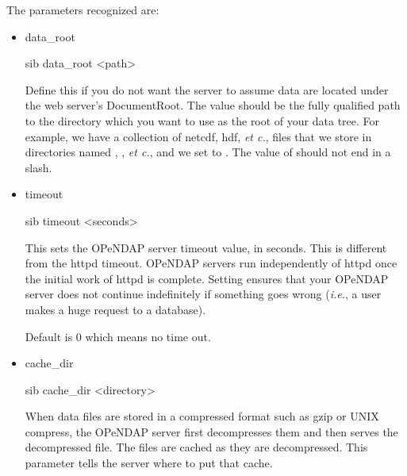 \documentclass{dods-book}
\begin{document}
  The parameters recognized are:

\begin{itemize}

\item data\_root

\begin{vcode}{sib}
  data_root <path>
\end{vcode}

Define this if you do not want the server to assume data are located
under the web server's DocumentRoot. The value  should be the
fully qualified path to the directory which you want to use as the
root of your data tree. For example, we have a collection of netcdf,
hdf, {\it et c.}, files that we store in directories named
,
, {\it et c.}, and we set
 to . The value of 
should not end in a slash.


\item timeout

\begin{vcode}{sib}
  timeout <seconds>
\end{vcode}

This sets the OPeNDAP server timeout value, in seconds. This is
different from the httpd timeout. OPeNDAP servers run independently of
httpd once the initial work of httpd is complete. Setting
 ensures that your OPeNDAP server does not continue
indefinitely if something goes wrong ({\it i.e.}, a user makes a huge
request to a database).

Default is 0 which means no time out.

\item cache\_dir

\begin{vcode}{sib}
  cache_dir <directory>
\end{vcode}

When data files are stored in a compressed format such as gzip or UNIX
compress, the OPeNDAP server first decompresses them and then serves
the decompressed file. The files are cached as they are decompressed.
This parameter tells the server where to put that cache. 


\end{itemize}
\end{document}
